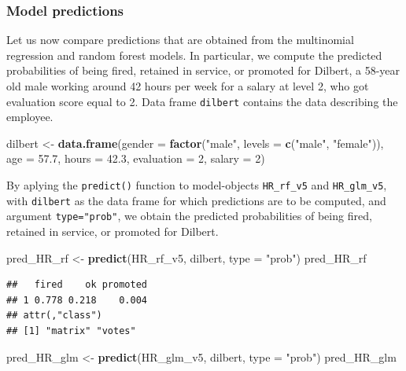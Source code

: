 \documentclass[12pt,]{krantz}
\newenvironment{Shaded}{\begin{snugshade}}{\end{snugshade}}
\newcommand{\DataTypeTok}[1]{\textcolor[rgb]{0.13,0.29,0.53}{#1}}
\newcommand{\DecValTok}[1]{\textcolor[rgb]{0.00,0.00,0.81}{#1}}
\newcommand{\FloatTok}[1]{\textcolor[rgb]{0.00,0.00,0.81}{#1}}
\newcommand{\KeywordTok}[1]{\textcolor[rgb]{0.13,0.29,0.53}{\textbf{#1}}}
\newcommand{\NormalTok}[1]{#1}
\newcommand{\StringTok}[1]{\textcolor[rgb]{0.31,0.60,0.02}{#1}}
\theoremstyle{definition}
\theoremstyle{definition}
\theoremstyle{definition}
\theoremstyle{remark}
\begin{document}
\hypertarget{predictionsHR}{%
\subsubsection{Model predictions}\label{predictionsHR}}

Let us now compare predictions that are obtained from the multinomial
regression and random forest models. In particular, we compute the
predicted probabilities of being fired, retained in service, or promoted
for Dilbert, a 58-year old male working around 42 hours per week for a
salary at level 2, who got evaluation score equal to 2. Data frame
\texttt{dilbert} contains the data describing the employee.

\begin{Shaded}
\begin{Highlighting}[]
\NormalTok{dilbert <-}\StringTok{ }\KeywordTok{data.frame}\NormalTok{(}\DataTypeTok{gender =} \KeywordTok{factor}\NormalTok{(}\StringTok{"male"}\NormalTok{, }\DataTypeTok{levels =} \KeywordTok{c}\NormalTok{(}\StringTok{"male"}\NormalTok{, }\StringTok{"female"}\NormalTok{)),}
                \DataTypeTok{age =} \FloatTok{57.7}\NormalTok{,}
                \DataTypeTok{hours =} \FloatTok{42.3}\NormalTok{,}
                \DataTypeTok{evaluation =} \DecValTok{2}\NormalTok{,}
                \DataTypeTok{salary =} \DecValTok{2}\NormalTok{)}
\end{Highlighting}
\end{Shaded}

By aplying the \texttt{predict()} function to model-objects
\texttt{HR\_rf\_v5} and \texttt{HR\_glm\_v5}, with \texttt{dilbert} as
the data frame for which predictions are to be computed, and argument
\texttt{type="prob"}, we obtain the predicted probabilities of being
fired, retained in service, or promoted for Dilbert.

\begin{Shaded}
\begin{Highlighting}[]
\NormalTok{pred_HR_rf <-}\StringTok{ }\KeywordTok{predict}\NormalTok{(HR_rf_v5, dilbert, }\DataTypeTok{type =} \StringTok{"prob"}\NormalTok{)}
\NormalTok{pred_HR_rf}
\end{Highlighting}
\end{Shaded}

\begin{verbatim}
##   fired    ok promoted
## 1 0.778 0.218    0.004
## attr(,"class")
## [1] "matrix" "votes"
\end{verbatim}

\begin{Shaded}
\begin{Highlighting}[]
\NormalTok{pred_HR_glm <-}\StringTok{ }\KeywordTok{predict}\NormalTok{(HR_glm_v5, dilbert, }\DataTypeTok{type =} \StringTok{"prob"}\NormalTok{)}
\NormalTok{pred_HR_glm}
\end{Highlighting}
\end{Shaded}
\end{document}
